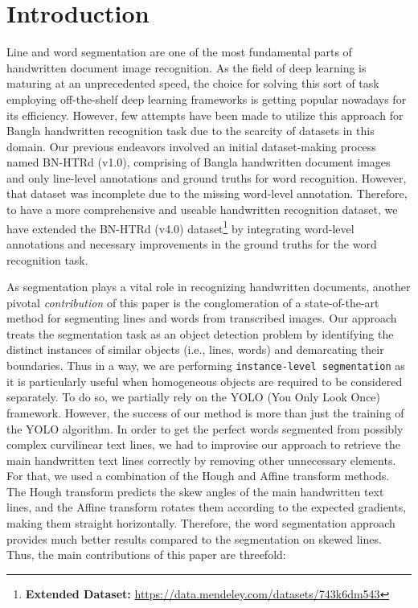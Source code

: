 \documentclass[runningheads]{llncs}
\begin{document}
\section{Introduction}


Line and word segmentation are one of the most fundamental parts of handwritten document image recognition. As the field of deep learning is maturing at an unprecedented speed, the choice for solving this sort of task employing off-the-shelf deep learning frameworks is getting popular nowadays for its efficiency. However, few attempts have been made to utilize this approach for Bangla handwritten recognition task due to the scarcity of datasets in this domain. Our previous endeavors involved an initial dataset-making process named BN-HTRd (v1.0), comprising of Bangla handwritten document images and only line-level annotations and ground truths for word recognition. However, that dataset was incomplete due to the missing word-level annotation. Therefore, to have a more comprehensive and useable handwritten recognition dataset, we have extended the BN-HTRd (v4.0) dataset\footnote{\textbf{Extended Dataset:} \url{https://data.mendeley.com/datasets/743k6dm543}} by integrating word-level annotations and necessary improvements in the ground truths for the word recognition task.   



As segmentation plays a vital role in recognizing handwritten documents, another pivotal \emph{contribution} of this paper is the conglomeration of a state-of-the-art method for segmenting lines and words from transcribed images. Our approach treats the segmentation task as an object detection problem by identifying the distinct instances of similar objects (i.e., lines, words) and demarcating their boundaries. Thus in a way, we are performing \texttt{instance-level segmentation} as it is particularly useful when homogeneous objects are required to be considered separately. To do so, we partially rely on the YOLO (You Only Look Once) framework. However, the success of our method is more than just the training of the YOLO algorithm. In order to get the perfect words segmented from possibly complex curvilinear text lines, we had to improvise our approach to retrieve the main handwritten text lines correctly by removing other unnecessary elements. For that, we used a combination of the Hough and Affine transform methods. The Hough transform predicts the skew angles of the main handwritten text lines, and the Affine transform rotates them according to the expected gradients, making them straight horizontally. Therefore, the word segmentation approach provides much better results compared to the segmentation on skewed lines. Thus, the main contributions of this paper are threefold:
\end{document}
